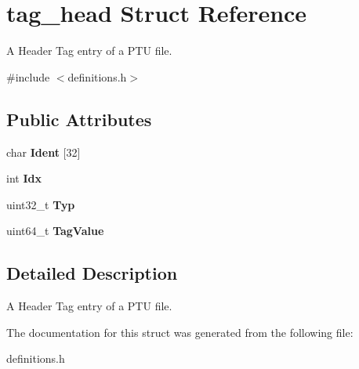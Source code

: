 \hypertarget{structtag__head}{}\section{tag\+\_\+head Struct Reference}
\label{structtag__head}


A Header Tag entry of a P\+TU file.  




{\ttfamily \#include $<$definitions.\+h$>$}

\subsection*{Public Attributes}
\begin{DoxyCompactItemize}
\item 
\mbox{\label{structtag__head_ab7d65ccb62a6230081d75af72828b3d1}} 
char {\bfseries Ident} \mbox{[}32\mbox{]}
\item 
\mbox{\label{structtag__head_ae278df8f798b40b1619eb95064295b3b}} 
int {\bfseries Idx}
\item 
\mbox{\label{structtag__head_a42078b26ba765a11a7a35d274e3a3b4b}} 
uint32\+\_\+t {\bfseries Typ}
\item 
\mbox{\label{structtag__head_aeb4f8bbc5112763d9afa9d3e4dd31b4b}} 
uint64\+\_\+t {\bfseries Tag\+Value}
\end{DoxyCompactItemize}


\subsection{Detailed Description}
A Header Tag entry of a P\+TU file. 

The documentation for this struct was generated from the following file\+:\begin{DoxyCompactItemize}
\item 
definitions.\+h\end{DoxyCompactItemize}
